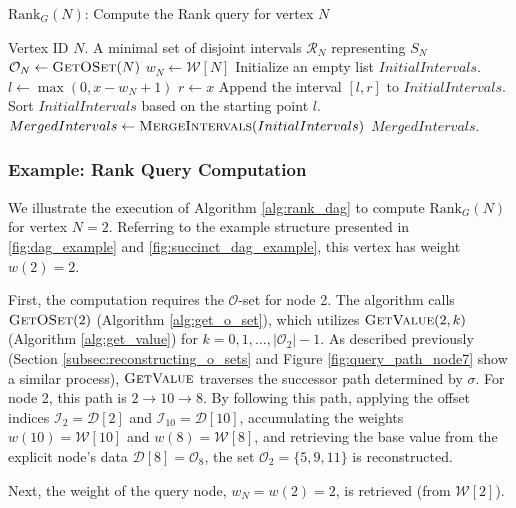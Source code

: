 \begin{algorithm}
    \caption{$\mathrm{Rank}_G(N)$: Compute the Rank query for vertex $N$}
    \label{alg:rank_dag}
    \small
    \begin{algorithmic}[1]
        \Require Vertex ID $N$.
        \Ensure A minimal set of disjoint intervals $\mathcal{R}_N$ representing $S_N$
        \State $\mathcal{O}_N \gets \textsc{GetOSet}(N)$
        \State $w_N \gets \mathcal{W}[N]$
        \State Initialize an empty list $InitialIntervals$.
        \State $l \gets \max(0, x - w_N + 1)$
        \State $r \gets x$
        \State Append the interval $[l, r]$ to $InitialIntervals$.
        \EndFor
        \State Sort $InitialIntervals$ based on the starting point $l$.
        \State $MergedIntervals \gets \textsc{MergeIntervals}(InitialIntervals)$
        \State \Return $MergedIntervals$.
    \end{algorithmic}
\end{algorithm}


\subsubsection*{Example: Rank Query Computation}
\label{subsubsec:rank_query_example_node2}

We illustrate the execution of Algorithm \ref{alg:rank_dag} to compute $\mathrm{Rank}_G(N)$ for vertex $N=2$. Referring to the example structure presented in \autoref{fig:dag_example} and \autoref{fig:succinct_dag_example}, this vertex has weight $w(2)=2$.

First, the computation requires the $\mathcal{O}$-set for node 2. The algorithm calls $\textsc{GetOSet}(2)$ (Algorithm \ref{alg:get_o_set}), which utilizes $\textsc{GetValue}(2, k)$ (Algorithm \ref{alg:get_value}) for $k=0, 1, \dots, |\mathcal{O}_2|-1$. As described previously (Section \ref{subsec:reconstructing_o_sets} and Figure \ref{fig:query_path_node7} show a similar process), $\textsc{GetValue}$ traverses the successor path determined by $\sigma$. For node 2, this path is $2 \to 10 \to 8$. By following this path, applying the offset indices $\mathcal{I}_2 = \mathcal{D}[2]$ and $\mathcal{I}_{10} = \mathcal{D}[10]$, accumulating the weights $w(10) = \mathcal{W}[10]$ and $w(8) = \mathcal{W}[8]$, and retrieving the base value from the explicit node's data $\mathcal{D}[8]=\mathcal{O}_8$, the set $\mathcal{O}_2 = \{5, 9, 11\}$ is reconstructed.

Next, the weight of the query node, $w_N = w(2) = 2$, is retrieved (from $\mathcal{W}[2]$).

